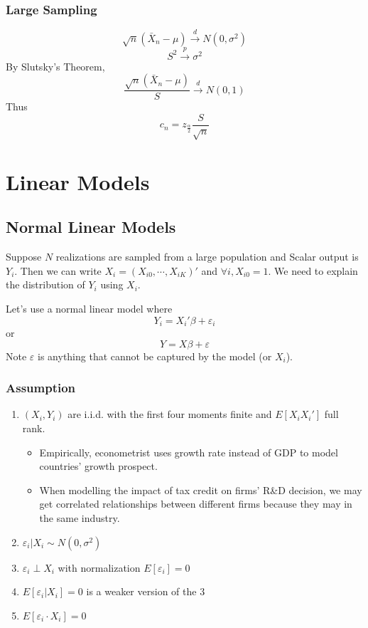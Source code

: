 \documentclass[11pt, a4paper, oneside]{article}
\theoremstyle{definition}
\theoremstyle{proposition}
\theoremstyle{corollary}
\theoremstyle{lemma}
\theoremstyle{theorem}
\begin{document}
\subsubsection{Large Sampling}
$$\sqrt{n}(\bar{X}_n - \mu) \overset{d}{\to} N(0, \sigma^2)$$
$$S^2 \overset{p}{\to} \sigma^2$$
By Slutsky's Theorem, 
$$\frac{\sqrt{n}(\bar{X}_n - \mu)}{S} \overset{d}{\to} N(0, 1)$$
Thus $$c_n = z_{\frac{\alpha}{2}}\frac{S}{\sqrt{n}}$$

\section{Linear Models}
\subsection{Normal Linear Models}
Suppose $N$ realizations are sampled from a large population and Scalar output is $Y_i$. Then we can write $X_i = (X_{i0}, \cdots, X_{iK})'$ and $\forall i, X_{i0} =1$. We need to explain the distribution of $Y_i$ using $X_i$. 

Let's use a normal linear model where $$Y_i = X_i'\beta + \varepsilon_i$$ or $$Y = X\beta+\varepsilon$$
Note $\varepsilon$ is anything that cannot be captured by the model (or $X_i$).

\subsubsection*{Assumption}
\begin{enumerate}
\item $(X_i, Y_i)$ are i.i.d. with the first four moments finite and $E[X_iX_i']$ full rank.
\begin{itemize}
\item Empirically, econometrist uses growth rate instead of GDP to model countries' growth prospect. 
\item When modelling the impact of tax credit on firms' R\&D decision, we may get correlated relationships between different firms because they may in the same industry. 
\end{itemize}
\item $\varepsilon_i|X_i \sim N(0, \sigma^2)$ 
\item $\varepsilon_i \perp X_i$ with normalization $E[\varepsilon_i]=0$
\item $E[\varepsilon_i|X_i]=0$ is a weaker version of the 3
\item $E[\varepsilon_i\cdot X_i] = 0$
\end{enumerate}
\end{document}
